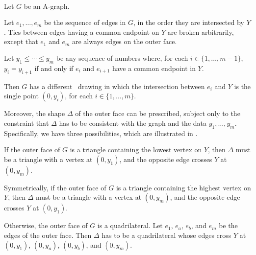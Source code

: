 \begin{thm}\ \newline
\begin{compactitem}
\item Let $G$ be an A-graph.
\item Let $e_1,\ldots,e_m$ be the sequence of edges in $G$,
  in the order they are intersected by $Y$. Ties between edges having
  a common endpoint on $Y$ are broken arbitrarily,
except that $e_1$ and $e_m$ are
always edges on the outer face.
\item Let $y_1\le\cdots\le y_m$ be any sequence of numbers where, for
  each $i\in\{1,\ldots,m-1\}$, $y_i=y_{i+1}$ if and only if $e_i$
  and $e_{i+1}$ have a common endpoint in $Y$.
			
			
\end{compactitem}
Then $G$ has a different \Fary\ drawing in which the intersection
between $e_i$ and $Y$ is the single point $(0,y_i)$, for each
$i\in\{1,\ldots,m\}$.

Moreover, the shape  $\Delta$ of the outer face can be prescribed,
subject only to the constraint that $\Delta$
has to be consistent with the graph and the data $y_1,\ldots,y_m$.
Specifically, we have three possibilities, which
 are illustrated in .

\begin{compactenum}[a)]
\item If the outer face of $G$ is a triangle containing the lowest
  vertex on $Y$, then $\Delta$ must be a triangle with a vertex at
	$(0,y_1)$, and the opposite edge crosses $Y$ at $(0,y_m)$.
\item Symmetrically, if the outer face of $G$ is a triangle containing
  the highest vertex on $Y$, then $\Delta$ must be a triangle with a vertex
	at $(0,y_m)$, and the opposite edge crosses $Y$ at $(0,y_1)$.
\item Otherwise, the outer face of $G$ is a quadrilateral.  Let $e_1$,
  $e_a$, $e_b$, and $e_m$ be the %
  edges of the outer face.  Then $\Delta$ has to be a quadrilateral
	whose edges cross $Y$ at $(0,y_1)$, $(0,y_a)$, $(0,y_b)$, and $(0,y_m)$.
\end{compactenum}
\end{thm}

